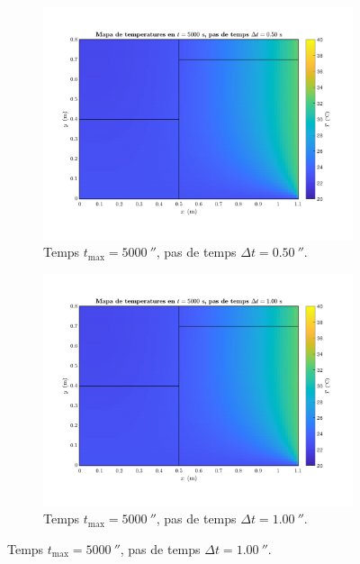\begin{figure}[ht]
	\centering
	\begin{subfigure}{.5\textwidth}
		\centering
		\includegraphics[width=.95\linewidth]{imagenes/04_influencia/pas_temps/pas_temps_7.pdf}
		\vspace{-15pt}
		\caption{Temps $t_\text{max} = 5000 \ \second$, pas de temps $\Delta t = 0.50 \ \second$.}
		\label{fig:pas_temps_7}
	\end{subfigure}%
	\begin{subfigure}{.5\textwidth}
		\centering
		\includegraphics[width=.95\linewidth]{imagenes/04_influencia/pas_temps/pas_temps_8.pdf}
		\vspace{-15pt}
		\caption{Temps $t_\text{max} = 5000 \ \second$, pas de temps $\Delta t = 1.00 \ \second$.}
		\label{fig:pas_temps_8}

\end{subfigure}
\end{figure}
